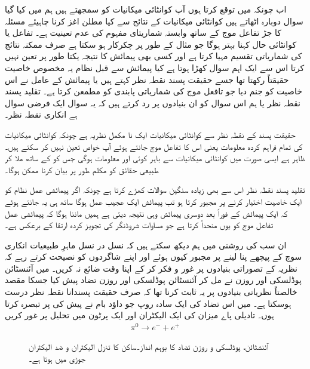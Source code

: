 اب چونکہ میں توقع کرتا ہوں آپ کوانٹائی میکانیات کو سمجھتے ہیں ہم  میں کیا گیا سوال دوبارہ اٹھاتے ہیں کوانٹائی میکانیات کے نتائج سے کیا مطلن اغز کرنا چاہیئے مسئلہ کا جڑ تفاعل موج کے ساتھ وابستہ شماریتای مفہوم کی عدم تعینیت ہے۔ تفاعل  یا کوانٹائی حال کہنا بہتر ہوگا جو مثال کے طور پر چکرکار ہو سکتا ہے صرف ممکنہ نتائج کی شماریاتی تقسیم مہیا کرتا ہے اور کسی بھی پیمائش کا نتیجہ یکتا طور پر تعین نہیں کرتا اس سے ایک اہم سوال کھڑا ہوتا ہے کیا پیمائش سے قبل نظام یہ مخصوص خاصیت حقیقتاً رکھتا تھا جسے حقیقت پسند نقطہ نظر کہتے ہیں یا پیمائش کے عامل نے اس خاصیت کو جنم دیا جو تافعل موج کی شماریاتی پابندی کو مطمعن کرتا ہے۔ تقلید پسند نقطہ نظر یا ہم اس سوال کو ان بنیادوں پر رد کرتے ہیں کہ یہ سوال ایک فرضی سوال ہے انکاری نقطہ نظر۔

حقیقت پسند کے نقطہ نظر سے کوانٹائی میکانیات ایک نا مکمل نظریہ ہے چونکہ کوانٹائی میکانیات کی تمام فراہم کردہ معلومات یعنی اس کا تفاعل موج جانتے ہوئے آپ خواص تعین نہیں کر سکتے ہیں۔ ظاہر ہے ایسی صورت میں کوانٹائی میکانیات سے باہر کوئی اور معلومات ہوگی جس کو  کے ساتھ ملا کر طبیعی حقائق کو مکلم طور پر بیان کرنا ممکن ہوگا۔

تقلید پسند نقطہ نظر اس سے بھی زیادہ سنگین سوالات کھڑے کرتا ہے چونکہ اگر پیمائشی عمل نظام کو ایک خاصیت اختیار کرنے پر مجبور کرتا ہو تب پیمائش ایک عجیب عمل ہوگا ساتھ ہی یہ جانتے ہوئے کہ ایک پیمائش کے فوراً بعد دوسری پیمائش وہی نتیجہ دیتی ہے ہمیں ماننا ہوگا کہ پیمائشی عمل تفاعل موج کو یوں منحداً کرتا ہے جو مساوات شروڈنگر کی تجویز کردہ ارتقا کے برعکس ہے۔

ان سب کی روشنی میں ہم دیکھ سکتے ہیں کہ نسل در نسل ماہرِ طبیعیات انکاری سوچ کے پیچھے پنا لینے پر مجبور کیوں ہوئے اور اپنے شاگردوں کو نصیحت کرتے رہے کہ نظریہ کے تصوراتی بنیادوں پر غور و فکر کر کے اپنا وقت ضائع نہ کریں۔
میں آئنسٹائن پوڈلسکی اور روزن نے مل کر آئنسٹائن پوڈلسکی اور روزن تضاد پیش کیا جسکا مقصد خالصتاً نظریاتی بنیادوں پر یہ ثابت کرنا تھا کہ صرف حقیقت پسندانا نقطہ نظر درست ہوسکتا ہے۔ میں اس تضاد کی ایک سادہ روپ جو داؤد بام نے پیش کی پر تبصرہ کرتا ہوں۔ تادیلی پاے میزان کی ایک الیکٹران اور ایک پرٹون میں تحلیل پر غور کریں
\begin{align*}
	\pi^0\to e^{-}+e^{+}
\end{align*}
%
\begin{figure}
\centering
{}
\caption{آئنشٹائن، پوڈلسکی و  روزن  تضاد کا بوہم انداز۔ساکن   کا تنزل الیکٹران و  ضد الیکٹران  جوڑی میں ہوتا ہے۔}
\label{شکل_بکھراو_بوہم_تنزل}
\end{figure}


